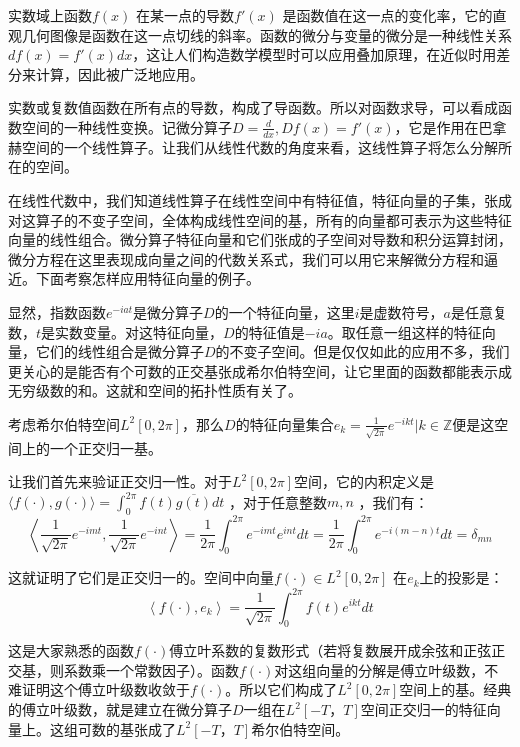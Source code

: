 实数域上函数$ f(x) $ 在某一点的导数$ f′(x) $ 是函数值在这一点的变化率，它的直观几何图像是函数在这一点切线的斜率。函数的微分与变量的微分是一种线性关系$ df(x)=f′(x)dx $，这让人们构造数学模型时可以应用叠加原理，在近似时用差分来计算，因此被广泛地应用。

实数或复数值函数在所有点的导数，构成了导函数。所以对函数求导，可以看成函数空间的一种线性变换。记微分算子$ D=\frac{d}{dx},Df(x)=f′(x) $，它是作用在巴拿赫空间的一个线性算子。让我们从线性代数的角度来看，这线性算子将怎么分解所在的空间。

在线性代数中，我们知道线性算子在线性空间中有特征值，特征向量的子集，张成对这算子的不变子空间，全体构成线性空间的基，所有的向量都可表示为这些特征向量的线性组合。微分算子特征向量和它们张成的子空间对导数和积分运算封闭，微分方程在这里表现成向量之间的代数关系式，我们可以用它来解微分方程和逼近。下面考察怎样应用特征向量的例子。

显然，指数函数$ e^{−iat} $是微分算子$ D $的一个特征向量，这里$ i $是虚数符号，$ a $是任意复数，$ t $是实数变量。对这特征向量，$ D $的特征值是$ -ia $。取任意一组这样的特征向量，它们的线性组合是微分算子$ D $的不变子空间。但是仅仅如此的应用不多，我们更关心的是能否有个可数的正交基张成希尔伯特空间，让它里面的函数都能表示成无穷级数的和。这就和空间的拓扑性质有关了。

考虑希尔伯特空间$ L^2[0,2π] $，那么$ D $的特征向量集合$ {e_k=\frac{1}{\sqrt{2\pi}}e^{−ikt}|k\in \mathbb{Z}} $便是这空间上的一个正交归一基。

让我们首先来验证正交归一性。对于$ L^2[0, 2π] $空间，它的内积定义是$ \langle f(\cdot),g(\cdot)\rangle = \int_{0}^{2\pi}f(t)\overline{g(t)}dt $ ，对于任意整数$ m,n $ ，我们有：
\begin{equation}
	\left \langle \frac{1}{\sqrt{2\pi}}e^{-imt},\frac{1}{\sqrt{2\pi}}e^{-int}\right \rangle =\frac{1}{2\pi}\int_0^{2\pi}e^{-imt}e^{int}dt =\frac{1}{2\pi}\int_0^{2\pi}e^{-i(m-n)t}dt = \delta_{mn}
\end{equation}

这就证明了它们是正交归一的。空间中向量$ f(\cdot)\in L^2[0,2\pi] $ 在$ e_k $上的投影是：
\begin{equation}
	\left \langle f(\cdot),e_k \right \rangle = \frac{1}{\sqrt{2\pi}}\int_0^{2\pi}f(t)e^{ikt}dt
\end{equation}

这是大家熟悉的函数$  f(\cdot) $傅立叶系数的复数形式（若将复数展开成余弦和正弦正交基，则系数乘一个常数因子）。函数$  f(\cdot) $对这组向量的分解是傅立叶级数，不难证明这个傅立叶级数收敛于$  f(\cdot) $。所以它们构成了$ L^2[0, 2π] $空间上的基。经典的傅立叶级数，就是建立在微分算子$ D $一组在$ L^2[-T，T] $空间正交归一的特征向量上。这组可数的基张成了$ L^2[-T，T] $希尔伯特空间。


